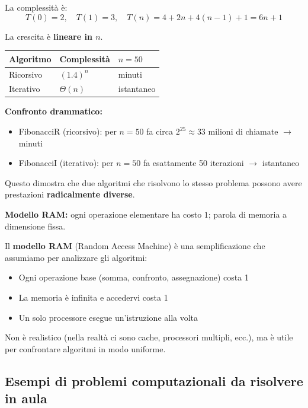 \documentclass[a4paper, 11pt]{article}
\theoremstyle{definition}
\theoremstyle{remark}
\theoremstyle{remark}
\newenvironment{nota}{%
	\begin{tcolorbox}[
		colback=codebg,
		colframe=primary,
		fonttitle=\bfseries,
		title=Nota,
		left=6pt, right=6pt, top=4pt, bottom=4pt
		]
	}{%
	\end{tcolorbox}
}
\begin{document}
	La complessità è:
	\[
	T(0) = 2, \quad T(1) = 3, \quad T(n) = 4 + 2n + 4(n-1) + 1 = 6n + 1
	\]
	
	La crescita è \textbf{lineare in $n$}.
	
	
	\begin{center}
		\begin{tabular}{lll}
			\toprule
			Algoritmo & Complessità & $n=50$ \\
			\midrule
			Ricorsivo & $(1.4)^n$   & minuti \\
			Iterativo & $\Theta(n)$ & istantaneo \\
			\bottomrule
		\end{tabular}
	\end{center}
	
	\begin{hardnote}
		\textbf{Confronto drammatico:}
		\begin{itemize}
			\item FibonacciR (ricorsivo): per $n=50$ fa circa $2^{25} \approx 33$ milioni di chiamate $\to$ minuti
			\item FibonacciI (iterativo): per $n=50$ fa esattamente 50 iterazioni $\to$ istantaneo
		\end{itemize}
		
		Questo dimostra che due algoritmi che risolvono lo stesso problema possono avere prestazioni \textbf{radicalmente diverse}.
	\end{hardnote}
	
	\noindent\textbf{Modello RAM:} ogni operazione elementare ha costo $1$;
	parola di memoria a dimensione fissa.
	
	\begin{nota}
		Il \textbf{modello RAM} (Random Access Machine) è una semplificazione che assumiamo per analizzare gli algoritmi:
		\begin{itemize}
			\item Ogni operazione base (somma, confronto, assegnazione) costa 1
			\item La memoria è infinita e accedervi costa 1
			\item Un solo processore esegue un'istruzione alla volta
		\end{itemize}
		
		Non è realistico (nella realtà ci sono cache, processori multipli, ecc.), ma è utile per confrontare algoritmi in modo uniforme.
	\end{nota}
	
	\subsection{Esempi di problemi computazionali da risolvere in aula}
	
\end{document}
